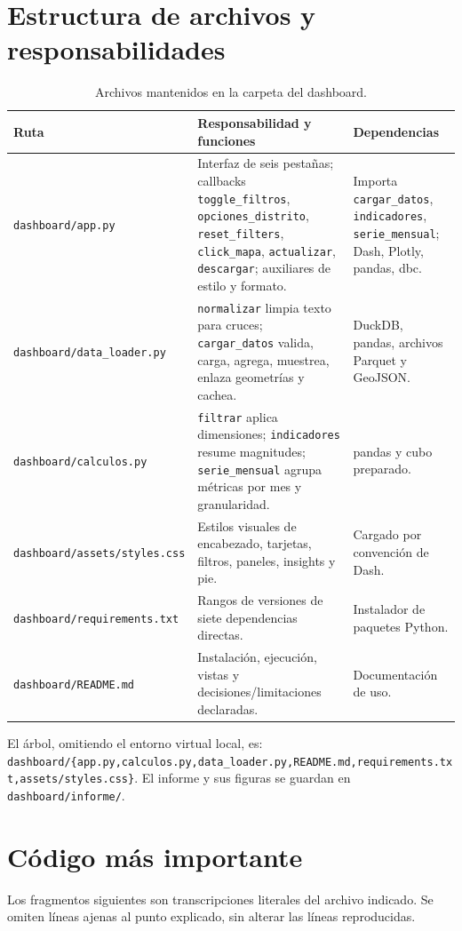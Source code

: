 \documentclass[11pt,a4paper]{article}
\begin{document}
\section{Estructura de archivos y responsabilidades}
\begin{table}[H]\small\centering
\begin{tabularx}{\textwidth}{p{4.1cm}Y Y}\toprule Ruta & Responsabilidad y funciones & Dependencias\\\midrule
\texttt{dashboard/app.py} & Interfaz de seis pestañas; callbacks \texttt{toggle\_filtros}, \texttt{opciones\_distrito}, \texttt{reset\_filters}, \texttt{click\_mapa}, \texttt{actualizar}, \texttt{descargar}; auxiliares de estilo y formato. & Importa \texttt{cargar\_datos}, \texttt{indicadores}, \texttt{serie\_mensual}; Dash, Plotly, pandas, dbc.\\
\texttt{dashboard/data\_loader.py} & \texttt{normalizar} limpia texto para cruces; \texttt{cargar\_datos} valida, carga, agrega, muestrea, enlaza geometrías y cachea. & DuckDB, pandas, archivos Parquet y GeoJSON.\\
\texttt{dashboard/calculos.py} & \texttt{filtrar} aplica dimensiones; \texttt{indicadores} resume magnitudes; \texttt{serie\_mensual} agrupa métricas por mes y granularidad. & pandas y cubo preparado.\\
\texttt{dashboard/assets/styles.css} & Estilos visuales de encabezado, tarjetas, filtros, paneles, insights y pie. & Cargado por convención de Dash.\\
\texttt{dashboard/requirements.txt} & Rangos de versiones de siete dependencias directas. & Instalador de paquetes Python.\\
\texttt{dashboard/README.md} & Instalación, ejecución, vistas y decisiones/limitaciones declaradas. & Documentación de uso.\\
\bottomrule\end{tabularx}\caption{Archivos mantenidos en la carpeta del dashboard.}\label{tab:archivos}
\end{table}
El árbol, omitiendo el entorno virtual local, es: \texttt{dashboard/\{app.py,calculos.py,data\_loader.py,README.md,requirements.txt,assets/styles.css\}}. El informe y sus figuras se guardan en \texttt{dashboard/informe/}.

\section{Código más importante}
Los fragmentos siguientes son transcripciones literales del archivo indicado. Se omiten líneas ajenas al punto explicado, sin alterar las líneas reproducidas.
\end{document}

